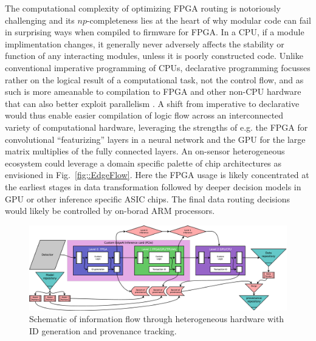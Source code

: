 \documentclass{article}
\begin{document}
The computational complexity of optimizing FPGA routing \cite{FPGAcomplexity,FPGAgraph} is notoriously challenging and its $np$-completeness lies at the heart of why modular code can fail in surprising ways when compiled to firmware for FPGA. 
In a CPU, if a module implimentation changes, it generally never adversely affects the stability or function of any interacting modules, unless it is poorly constructed code.
Unlike conventional imperative programming of CPUs, declarative programming focusses rather on the logical result of a computational task, not the control flow, and as such is more ameanable to compilation to FPGA and other non-CPU hardware that can also better exploit parallelism \cite{Lloyd1994}.
A shift from imperative to declarative would thus enable easier compilation of logic flow across an interconnected variety of computational hardware, leveraging the strengths of e.g. the FPGA for convolutional ``featurizing'' layers in a neural network and the GPU for the large matrix multiplies of the fully connected layers.
An on-sensor heterogeneous ecosystem could leverage a domain specific palette of chip architectures as envisioned in Fig.~\ref{fig;:EdgeFlow}.
Here the FPGA usage is likely concentrated at the earliest stages in data transformation followed by deeper decision models in GPU or other inference specific ASIC chips.
The final data routing decisions would likely be controlled by on-borad ARM processors. 

\begin{figure}
	\centerline{\includegraphics[clip,width=\linewidth]{EdgeFlow.eps}}
	\caption{
		\label{fig::EdgeFlow}
		Schematic of information flow through heterogeneous hardware with ID generation and provenance tracking.
		}
\end{figure}

\end{document}
